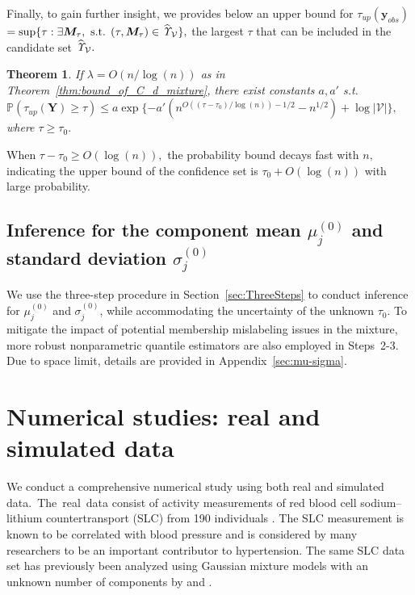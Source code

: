 \documentclass[12pt]{article}
\theoremstyle{shortspace}
\newtheorem{theorem}{Theorem}
\def\*#1{\bm{#1}}
\def\P{\mathbb P}
\begin{document}
Finally, to gain further insight, we provides below an upper bound for  $\tau_{up}(\*y_{obs})$ {\small $=\sup\{\tau: \exists \*M_\tau, \mbox{ s.t. } (\tau, {\*M}_\tau) \in \widehat{\it \Upsilon}_{\mathcal V} \},$} 
the largest $\tau$ that can be included in the candidate set $\widehat{\it \Upsilon}_{\mathcal V}.$ 
\begin{theorem}
\label{the:upper_bound}
   If  $\lambda = O(n/\log(n))$ as in Theorem~\ref{thm:bound_of_C_d_mixture},  there exist constants $a, a'$ s.t. 
       $ \P(\tau_{up}(\*Y) \geq  \tau) \leq a \exp\{-a'(n^{O((\tau-\tau_0)/\log(n)) -1/2} - n^{1/2})+ \log |\mathcal V|\}, $ 
    where $\tau \geq \tau_0.$
\end{theorem}
\noindent
When $\tau - \tau_0 \geq O(\log(n)),$ the probability bound decays fast with $n,$ indicating the upper bound of the confidence set is $\tau_0 + O(\log(n))$ with large probability.


\subsection{\hspace{-3mm}
Inference for the component mean $\mu_j^{(0)}$ and standard deviation $\sigma_j^{(0)}$ }
\label{sec:mixture-mu-sigma-brief}

We use the three-step procedure in Section~\ref{sec:ThreeSteps} to conduct inference for $\mu_j^{(0)}$ and $\sigma_j^{(0)}$, while accommodating the uncertainty of the unknown $\tau_0$. To mitigate the impact of potential membership mislabeling issues in the mixture, more robust nonparametric quantile estimators are also employed in Steps~2-3. Due to space limit, details are provided in Appendix~\ref{sec:mu-sigma}.




\section{Numerical studies: real and simulated data}\label{sec: numerical}
We conduct a comprehensive numerical study using both real and simulated data.{\small~}The~real~data consist of activity measurements of red blood cell sodium–lithium countertransport (SLC) 
from 190 individuals \citep{dudley_assessing_1991}. The SLC measurement is known to be correlated with blood pressure and is considered by many researchers to be an important contributor to hypertension. The same SLC data set has previously been analyzed using Gaussian mixture models with an unknown number of components by \citet{roeder_graphical_1994} and \citet{chen_inference_2012}. 
\end{document}
